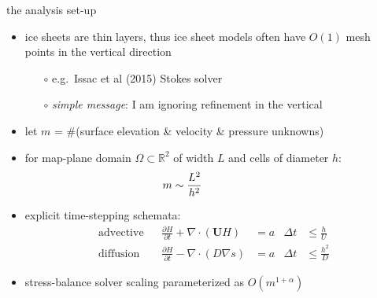 \documentclass[svgnames,
               hyperref={colorlinks,citecolor=DeepPink4,linkcolor=FireBrick,urlcolor=Maroon},
               usepdftitle=false]  %
               {beamer}
\newcommand{\RR}{\mathbb{R}}
\newcommand{\grad}{\nabla}
\newcommand{\bU}{\mathbf{U}}
\begin{document}
\begin{frame}{the analysis set-up}

\begin{itemize}
\item ice sheets are thin layers, thus ice sheet models often have $O(1)$ mesh points in the vertical direction
    \begin{itemize}
    \item[$\circ$] e.g.~Issac et al (2015) Stokes solver
    \item[$\circ$] \emph{simple message}: I am ignoring refinement in the vertical
    \end{itemize}

\medskip
\item let $m$ = \#(surface elevation \& velocity \& pressure unknowns)
\item for map-plane domain $\Omega \subset \RR^2$ of width $L$ and cells of diameter $h$:
  $$m \sim \frac{L^2}{h^2} \hspace{20mm}$$

\vspace{-14mm}
\hfill
{}

\vspace{-2mm}
\item explicit time-stepping schemata:
{\footnotesize
\begin{align*}
\text{advective} && \frac{\partial H}{\partial t} + \nabla \cdot \left(\bU H\right) &= a & \Delta t &\le \frac{h}{U} \\
\text{diffusion} && \frac{\partial H}{\partial t} - \nabla \cdot \left(D \grad s\right) &= a & \Delta t &\le \frac{h^2}{D}
\end{align*}
}

\item stress-balance solver scaling parameterized as $O(m^{1+\alpha})$
\end{itemize}
\end{frame}
\end{document}
